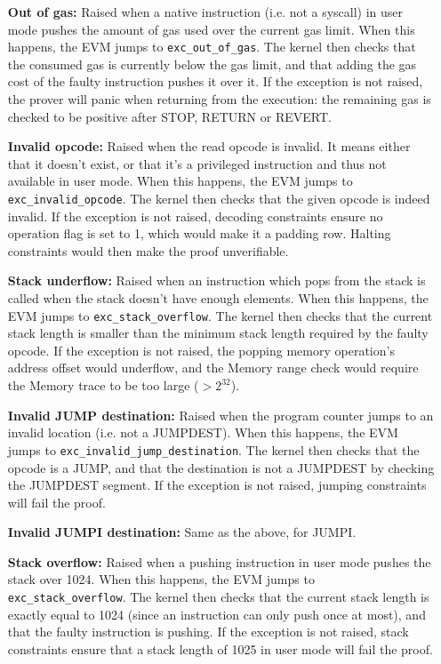 \begin{enumerate}[align=left]
  \item[\textbf{Out of gas:}] Raised when a native instruction (i.e. not a syscall) in user mode pushes the amount of gas used over the current gas limit.
When this happens, the EVM jumps to \texttt{exc\_out\_of\_gas}. The kernel then checks that the consumed gas is currently below the gas limit,
and that adding the gas cost of the faulty instruction pushes it over it.
If the exception is not raised, the prover will panic when returning from the execution: the remaining gas is checked to be positive after STOP, RETURN or REVERT.
  \item[\textbf{Invalid opcode:}] Raised when the read opcode is invalid. It means either that it doesn't exist, or that it's a privileged instruction and
thus not available in user mode. When this happens, the EVM jumps to \texttt{exc\_invalid\_opcode}. The kernel then checks that the given opcode is indeed invalid.
If the exception is not raised, decoding constraints ensure no operation flag is set to 1, which would make it a padding row. Halting constraints would then make the proof
unverifiable.
  \item[\textbf{Stack underflow:}] Raised when an instruction which pops from the stack is called when the stack doesn't have enough elements.
When this happens, the EVM jumps to \texttt{exc\_stack\_overflow}. The kernel then checks that the current stack length is smaller than the minimum 
stack length required by the faulty opcode.
If the exception is not raised, the popping memory operation's address offset would underflow, and the Memory range check would require the Memory trace to be too
large ($>2^{32}$).
  \item[\textbf{Invalid JUMP destination:}] Raised when the program counter jumps to an invalid location (i.e. not a JUMPDEST). When this happens, the EVM jumps to
\texttt{exc\_invalid\_jump\_destination}. The kernel then checks that the opcode is a JUMP, and that the destination is not a JUMPDEST by checking the
JUMPDEST segment.
If the exception is not raised, jumping constraints will fail the proof.
  \item[\textbf{Invalid JUMPI destination:}] Same as the above, for JUMPI.
  \item[\textbf{Stack overflow:}] Raised when a pushing instruction in user mode pushes the stack over 1024. When this happens, the EVM jumps
to \texttt{exc\_stack\_overflow}. The kernel then checks that the current stack length is exactly equal to 1024 (since an instruction can only
push once at most), and that the faulty instruction is pushing.
If the exception is not raised, stack constraints ensure that a stack length of 1025 in user mode will fail the proof.
\end{enumerate}
